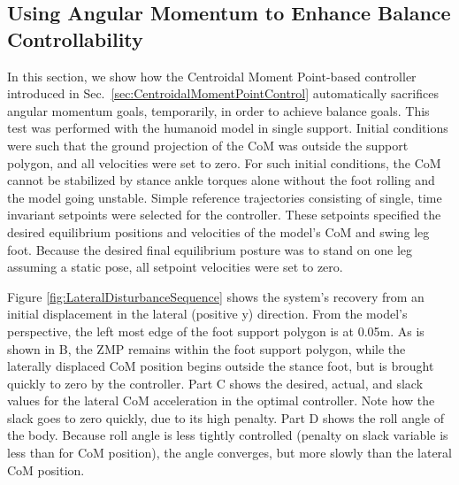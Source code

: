 \documentclass{llncs}
\begin{document}
\subsection{Using Angular Momentum to Enhance Balance Controllability}

In this section, we show how the Centroidal Moment Point-based controller introduced in 
Sec.~\ref{sec:CentroidalMomentPointControl} automatically sacrifices angular momentum goals, temporarily,
in order to achieve balance goals.
This test was performed with the humanoid model in single support.
Initial conditions were such that the ground projection of the CoM was outside the support polygon, and all velocities were set to zero.  
For such initial conditions, the CoM cannot be stabilized by stance ankle torques alone without the foot rolling and the model going unstable.  
Simple reference trajectories consisting of single, time invariant setpoints were selected for the controller.  
These setpoints specified the desired equilibrium positions and velocities of the model’s CoM and swing leg foot. 
Because the desired final equilibrium posture was to stand on one leg assuming a static pose, all setpoint velocities were set to zero.

Figure \ref{fig:LateralDisturbanceSequence} shows the system’s recovery from an initial displacement in the lateral (positive y) direction. 
From the model’s perspective, the left most edge of the foot support polygon is at 0.05m.  
As is shown in B, the ZMP remains within the foot support polygon, while the laterally displaced CoM position begins outside the stance foot, 
but is brought quickly to zero by the controller.  
Part C shows the desired, actual, and slack values for the lateral CoM acceleration in the optimal controller.  
Note how the slack goes to zero quickly, due to its high penalty.  
Part D shows the roll angle of the body.  
Because roll angle is less tightly controlled (penalty on slack variable is less than for CoM position), the angle converges, but more slowly than the lateral CoM position.
\end{document}
